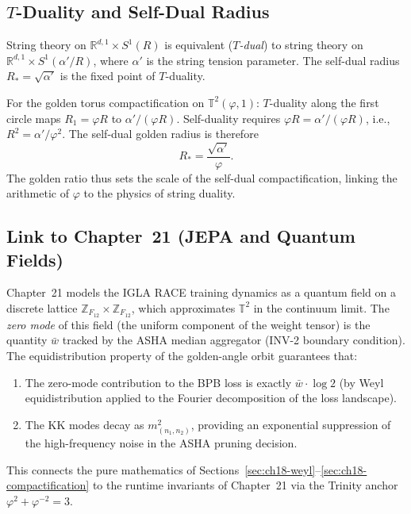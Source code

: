 \subsection{$T$-Duality and Self-Dual Radius}\label{subsec:ch18-tduality}

String theory on $\mathbb{R}^{d,1} \times S^1(R)$ is equivalent (\emph{$T$-dual}) to
string theory on $\mathbb{R}^{d,1} \times S^1(\alpha'/R)$, where $\alpha'$ is the
string tension parameter.
The self-dual radius $R_* = \sqrt{\alpha'}$ is the fixed point of $T$-duality.

For the golden torus compactification on $\mathbb{T}^2(\varphi, 1)$:
$T$-duality along the first circle maps $R_1 = \varphi R$ to $\alpha'/(\varphi R)$.
Self-duality requires $\varphi R = \alpha'/(\varphi R)$, i.e., $R^2 = \alpha'/\varphi^2$.
The self-dual golden radius is therefore
\begin{equation}\label{eq:golden-self-dual}
  R_* = \frac{\sqrt{\alpha'}}{\varphi}.
\end{equation}
The golden ratio thus sets the scale of the self-dual compactification, linking the
arithmetic of $\varphi$ to the physics of string duality.

\subsection{Link to Chapter~21 (JEPA and Quantum Fields)}\label{subsec:ch18-ch21-link}

Chapter~21 models the IGLA RACE training dynamics as a quantum field on a discrete
lattice $\mathbb{Z}_{F_{12}} \times \mathbb{Z}_{F_{12}}$, which approximates
$\mathbb{T}^2$ in the continuum limit.
The \emph{zero mode} of this field (the uniform component of the weight tensor)
is the quantity $\bar w$ tracked by the ASHA median aggregator (INV-2 boundary
condition).
The equidistribution property of the golden-angle orbit guarantees that:
\begin{enumerate}
\item The zero-mode contribution to the BPB loss is exactly $\bar w \cdot \log 2$
  (by Weyl equidistribution applied to the Fourier decomposition of the loss landscape).
\item The KK modes decay as $m_{(n_1,n_2)}^2$, providing an exponential suppression
  of the high-frequency noise in the ASHA pruning decision.
\end{enumerate}
This connects the pure mathematics of Sections~\ref{sec:ch18-weyl}--\ref{sec:ch18-compactification}
to the runtime invariants of Chapter~21 via the Trinity anchor $\varphi^2 + \varphi^{-2} = 3$.

